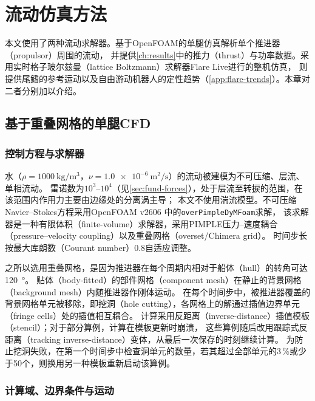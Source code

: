 \chapter{流动仿真方法}
\label{ch:cfd}

本文使用了两种流动求解器。基于OpenFOAM的单腿仿真解析单个推进器（propulsor）周围的流动，
并提供\cref{ch:results}中的推力（thrust）与功率数据。采用实时格子玻尔兹曼（lattice Boltzmann）求解器Flare Live进行的整机仿真，
则提供尾鳍的参考运动以及自由游动机器人的定性趋势（\cref{app:flare-trends}）。本章对二者分别加以介绍。

\section{基于重叠网格的单腿CFD}
\label{sec:cfd-of}

\subsection{控制方程与求解器}

水（$\rho=\SI{1000}{\kilo\gram\per\cubic\metre}$，$\nu=\SI{1.0e-6}{\square\metre\per\second}$）的流动被建模为不可压缩、层流、单相流动。
雷诺数为$10^3$--$10^4$（见\cref{sec:fund-forces}），处于层流至转捩的范围，在该范围内作用力主要由边缘处的分离涡主导；
本文不使用湍流模型。不可压缩Navier--Stokes方程采用OpenFOAM v2606 \cite{Weller1998}中的\texttt{overPimpleDyMFoam}求解，
该求解器是一种有限体积（finite-volume）求解器，采用PIMPLE压力--速度耦合（pressure--velocity coupling）以及重叠网格（overset/Chimera grid）\cite{Windt2020}。
时间步长按最大库朗数（Courant number）0.8自适应调整。

之所以选用重叠网格，是因为推进器在每个周期内相对于船体（hull）的转角可达\SI{120}{\degree}。
贴体（body-fitted）的部件网格（component mesh）在静止的背景网格（background mesh）内随推进器作刚体运动。
在每个时间步中，被推进器覆盖的背景网格单元被移除，即挖洞（hole cutting），各网格上的解通过插值边界单元（fringe cells）处的插值相互耦合。
计算采用反距离（inverse-distance）插值模板（stencil）；对于部分算例，计算在模板更新时崩溃，
这些算例随后改用跟踪式反距离（tracking inverse-distance）变体，从最后一次保存的时刻继续计算。
为防止挖洞失败，在第一个时间步中检查洞单元的数量，若其超过全部单元的3\,\%或少于50个，则换用另一种模板重新启动该算例。

\subsection{计算域、边界条件与运动}

